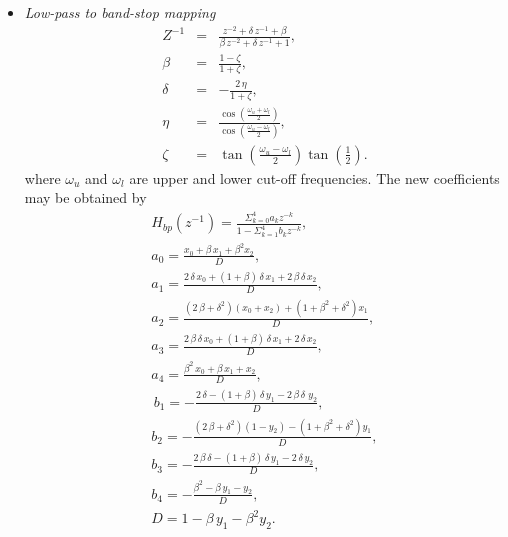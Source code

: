 \documentclass{sebase}
\begin{document}
\begin{itemize}
\item \textit{Low-pass to band-stop mapping} 
\begin{eqnarray}
Z^{-1} &=&\frac{z^{-2}+\delta \,z^{-1}+\beta }{\beta \,z^{-2}+\delta
\,z^{-1}+1},  \label{Z_low2BandStop} \\
\beta &=&\frac{1-\zeta }{1+\zeta },  \label{Beta_low2BandStop} \\
\delta &=&-\frac{2\,\eta }{1+\zeta },  \label{Delta_low2BandStop} \\
\eta &=&\frac{\cos \left( \frac{\omega _{u}+\omega _{l}}{2}\right) }{\cos
\left( \frac{\omega _{u}-\omega _{l}}{2}\right) },  \label{Eta_low2BandStop}
\\
\zeta &=&\tan \left( \frac{\omega _{u}-\omega _{l}}{2}\right) \tan \left( 
\frac{1}{2}\right) .  \label{Ksi_low2BandStop}
\end{eqnarray}
where $\omega _{u}$ and $\omega _{l}$ are upper and lower cut-off
frequencies. The new coefficients may be obtained by 
\begin{gather}
H_{bp}\left( z^{-1}\right) =\frac{\Sigma _{k=0}^{4}a_{k}z^{-k}}{1-\Sigma
_{k=1}^{4}b_{k}z^{-k}}, \\
a_{0}=\frac{x_{0}+\beta \,x_{1}+\beta ^{2}x_{2}}{D},  \label{a0_Band_Stop} \\
a_{1}=\frac{2\,\delta \,x_{0}+\left( 1+\beta \right) \,\delta
\,x_{1}+2\,\beta \,\delta \,x_{2}}{D},  \label{a1_Band_Stop} \\
a_{2}=\frac{\left( 2\,\beta +\delta ^{2}\right) \left( x_{0}+x_{2}\right)
+\left( 1+\beta ^{2}+\delta ^{2}\right) x_{1}}{D},  \label{a2_Band_Stop} \\
a_{3}=\frac{2\,\beta \,\delta \,x_{0}+\left( 1+\beta \right) \,\delta
\,x_{1}+2\,\delta \,x_{2}}{D},  \label{a3_Band_Stop} \\
a_{4}=\frac{\beta ^{2}\,x_{0}+\beta \,x_{1}+x_{2}}{D},  \label{a4_Band_Stop}
\\
\,b_{1}=-\frac{2\,\delta -\left( 1+\beta \right) \,\delta \,y_{1}-2\,\beta
\,\delta \,\,y_{2}}{D},  \label{b1_Band_Stop} \\
b_{2}=-\frac{\left( 2\,\beta +\delta ^{2}\right) \left( 1-y_{2}\right)
-\left( 1+\beta ^{2}+\delta ^{2}\right) y_{1}}{D},  \label{b2_Band_Stop} \\
b_{3}=-\frac{2\,\beta \,\delta -\left( 1+\beta \right) \,\delta
\,y_{1}-2\,\delta \,y_{2}}{D},  \label{b3_Band_Stop} \\
b_{4}=-\frac{\beta ^{2}-\beta \,y_{1}-y_{2}}{D},  \label{b4_Band_Stop} \\
D=1-\beta \,y_{1}-\beta ^{2}y_{2}.  \label{D_Band_Stop}
\end{gather}
\end{itemize}
\end{document}
